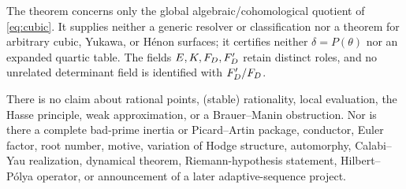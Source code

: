 The theorem concerns only the global algebraic/cohomological quotient of
\cref{eq:cubic}.  It supplies neither a generic resolver or classification
nor a theorem for arbitrary cubic, Yukawa, or H\'enon surfaces; it certifies
neither \(\delta=P(\theta)\) nor an expanded quartic table.  The fields
\(E,K,F_D,F_D'\) retain distinct roles, and no unrelated determinant field
is identified with \(F_D'/F_D\).

There is no claim about rational points, (stable) rationality, local
evaluation, the Hasse principle, weak approximation, or a Brauer--Manin
obstruction.  Nor is there a complete bad-prime inertia or Picard--Artin
package, conductor, Euler factor, root number, motive, variation of Hodge
structure, automorphy, Calabi--Yau realization, dynamical theorem,
Riemann-hypothesis statement, Hilbert--P\'olya operator, or announcement of a
later adaptive-sequence project.
